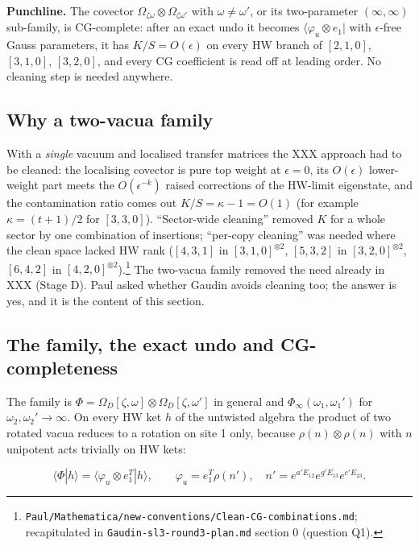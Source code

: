 \documentclass[11pt]{article}
\begin{document}
\textbf{Punchline.} The covector $\Omega_{\zeta\omega}\otimes\Omega_{\zeta\omega'}$ with $\omega\neq\omega'$, or its two-parameter $(\infty,\infty)$ sub-family, is CG-complete: after an exact undo it becomes $\langle\varphi_u\otimes e_1|$ with $\epsilon$-free Gauss parameters, it has $K/S=O(\epsilon)$ on every HW branch of $[2,1,0]$, $[3,1,0]$, $[3,2,0]$, and every CG coefficient is read off at leading order.
No cleaning step is needed anywhere.

\subsection{Why a two-vacua family}\label{sec:why2}

With a \emph{single} vacuum and localised transfer matrices the XXX approach had to be cleaned: the localising covector is pure top weight at $\epsilon=0$, its $O(\epsilon)$ lower-weight part meets the $O(\epsilon^{-k})$ raised corrections of the HW-limit eigenstate, and the contamination ratio comes out $K/S=\kappa-1=O(1)$ (for example $\kappa=(t+1)/2$ for $[3,3,0]$).
``Sector-wide cleaning'' removed $K$ for a whole sector by one combination of insertions; ``per-copy cleaning'' was needed where the clean space lacked HW rank ($[4,3,1]$ in $[3,1,0]^{\otimes2}$, $[5,3,2]$ in $[3,2,0]^{\otimes2}$, $[6,4,2]$ in $[4,2,0]^{\otimes2}$).\footnote{\texttt{Paul/\allowbreak{}Mathematica/\allowbreak{}new-\allowbreak{}conventions/\allowbreak{}Clean-\allowbreak{}CG-\allowbreak{}combinations.\allowbreak{}md}; recapitulated in \texttt{Gaudin-\allowbreak{}sl3-\allowbreak{}round3-\allowbreak{}plan.\allowbreak{}md} section 0 (question Q1).} The two-vacua family removed the need already in XXX (Stage D).
Paul asked whether Gaudin avoids cleaning too; the answer is yes, and it is the content of this section.

\subsection{The family, the exact undo and CG-completeness}\label{sec:undo}

The family is $\Phi=\Omega_D[\zeta,\omega]\otimes\Omega_D[\zeta,\omega']$ in general and $\Phi_\infty(\omega_1,\omega_1')$ for $\omega_2,\omega_2'\to\infty$. On every HW ket $h$ of the untwisted algebra the product of two rotated vacua reduces to a rotation on site 1 only, because $\rho(n)\otimes\rho(n)$ with $n$ unipotent acts trivially on HW kets:

\begin{equation}
\langle\Phi|h\rangle=\langle\varphi_u\otimes e_1^T|h\rangle,\qquad \varphi_u=e_1^T\rho(n'),\quad n'=e^{a'E_{12}}e^{g'E_{13}}e^{c'E_{23}}.\label{eq:undo}
\end{equation}
\end{document}
